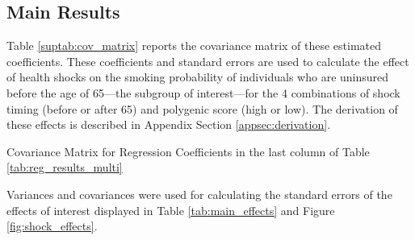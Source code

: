 %
%	
%
\subsection{Main Results}
\label{supsec:main}

Table \ref{suptab:cov_matrix} reports the covariance matrix of these estimated coefficients.
These coefficients and standard errors are used to calculate the effect of health shocks on the smoking probability of individuals who are uninsured before the age of 65---the subgroup of interest---for the 4 combinations of shock timing (before or after 65) and polygenic score (high or low).
The derivation of these effects is described in Appendix Section \ref{appsec:derivation}.

\begin{table} \centering
			\caption{Covariance Matrix for Regression Coefficients in the last column of Table \ref{tab:reg_results_multi}}
			\label{suptab:cov_matrix}
	\resizebox{!}{0.14\textheight}{
		
	}
	\begin{flushleft}
	Variances and covariances were used for calculating the standard errors of the effects of interest displayed in Table \ref{tab:main_effects} and Figure \ref{fig:shock_effects}.
	\end{flushleft}
\end{table}


